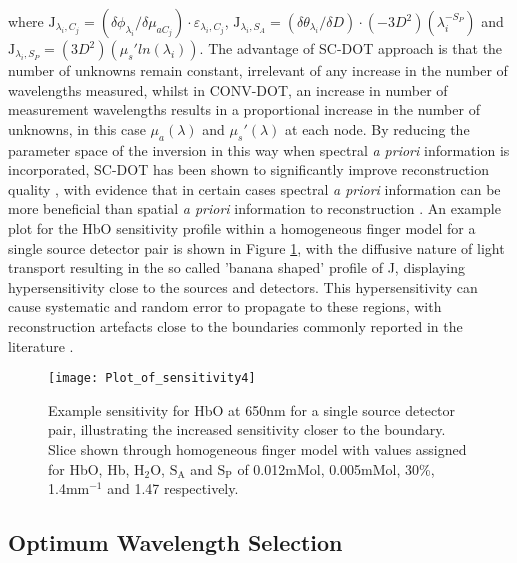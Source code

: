 \documentclass[twoside]{bhamthesis}
\theoremstyle{definition}
\begin{document}
where $\mathrm{J}_{\lambda_{i},C_{j}} = (\delta\phi_{\lambda_{i}}/\delta\mu_{aC_{j}})\cdot\varepsilon_{\lambda_{i},C_{j}}$, $\mathrm{J}_{\lambda_{i},S_A} = (\delta\theta_{\lambda_{i}}/\delta D) \cdot (-3D^2)(\lambda_{i}^{-S_P})$ and $\mathrm{J}_{\lambda_{i},S_P} = (3D^2) (\mu_s' ln(\lambda_{i}))$. The advantage of SC-DOT approach is that the number of unknowns remain constant, irrelevant of any increase in the number of wavelengths measured, whilst in CONV-DOT, an increase in number of measurement wavelengths results in a proportional increase in the number of unknowns, in this case $\mu_a(\lambda)$ and $\mu_s'(\lambda)$ at each node. By reducing the parameter space of the inversion in this way when spectral \textit{a priori} information is incorporated, SC-DOT has been shown to significantly improve reconstruction quality \cite{srinivasan2005spectrally}, with evidence that in certain cases spectral \textit{a priori} information can be more beneficial than spatial \textit{a priori} information to reconstruction \cite{brooksby2005spectral}.
An example plot for the HbO sensitivity profile within a homogeneous finger model for a single source detector pair is shown in Figure \ref{fig:Sensitivity}, with the diffusive nature of light transport resulting in the so called 'banana shaped' profile of J, displaying hypersensitivity close to the sources and detectors. This hypersensitivity can cause systematic and random error to propagate to these regions, with reconstruction artefacts close to the boundaries commonly reported in the literature \cite{brooksby2005spectral,boas2001simultaneous}.

\begin{figure}[!ht]
  \centering
  \texttt{[image: Plot\_of\_sensitivity4]}
\caption{Example sensitivity for HbO at 650nm for a single source detector pair, illustrating the increased sensitivity closer to the boundary. Slice shown through homogeneous finger model with values assigned for HbO, Hb, $\mathrm{H_2O}$, $\mathrm{S_A}$ and $\mathrm{S_P}$ of 0.012mMol, 0.005mMol, 30\%, 1.4mm$^{-1}$ and 1.47 respectively.}
\label{fig:Sensitivity}
\end{figure}

\subsection{Optimum Wavelength Selection}
\label{Optimum_wavelength}
\end{document}
